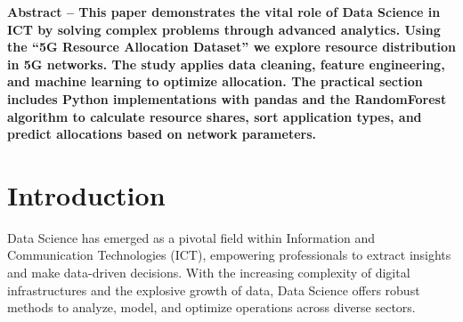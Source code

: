 \documentclass[a4paper, 10pt, twocolumn]{article}
\begin{document}
\pagestyle{empty}

\setlength\parindent{0.8cm}









\noindent
\textbf{Abstract – This paper demonstrates the vital role of Data Science in ICT by solving complex problems through advanced analytics. Using the “5G Resource Allocation Dataset” \cite{SOBHY2023} we explore resource distribution in 5G networks. The study applies data cleaning, feature engineering, and machine learning to optimize allocation. The practical section includes Python implementations with pandas and the RandomForest \cite{RandomForestRegressor} algorithm to calculate resource shares, sort application types, and predict allocations based on network parameters.}


\section{Introduction}

Data Science has emerged as a pivotal field within Information and Communication Technologies (ICT), empowering professionals to extract insights and make data-driven decisions. With the increasing complexity of digital infrastructures and the explosive growth of data, Data Science offers robust methods to analyze, model, and optimize operations across diverse sectors.
\end{document}
